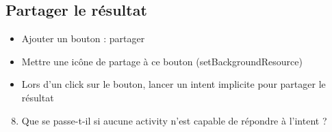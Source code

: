 \documentclass{article}
\begin{document}
\subsection{Partager le résultat}
\begin{itemize}
\item Ajouter un bouton : partager
\item Mettre une icône de partage à ce bouton (setBackgroundResource)
\item Lors d'un click sur le bouton, lancer un intent implicite pour partager le résultat
\end{itemize}
\begin{enumerate}
 \setcounter{enumi}{7}
\item Que se passe-t-il si aucune activity n'est capable de répondre à l'intent
?
\end{enumerate}
\end{document}
